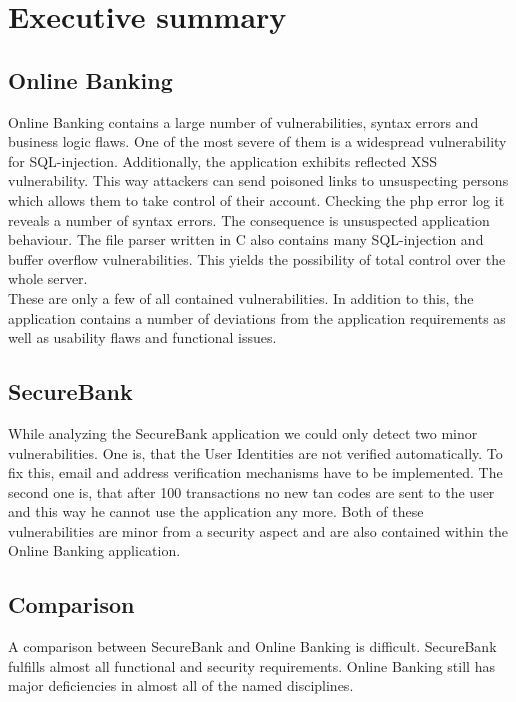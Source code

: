\chapter{Executive summary}
\section*{Online Banking}
Online Banking contains a large number of vulnerabilities, syntax errors and business logic flaws.
One of the most severe of them is a widespread vulnerability for SQL-injection. Additionally, the application exhibits reflected XSS vulnerability. This way attackers can send poisoned links to unsuspecting persons which allows them to take control of their account.
Checking the php error log it reveals a number of syntax errors. The consequence is unsuspected application behaviour.
The file parser written in C also contains many SQL-injection and buffer overflow vulnerabilities. This yields the possibility of total control over the whole server.\\
These are only a few of all contained vulnerabilities.
In addition to this, the application contains a number of deviations from the application requirements as well as usability flaws and functional issues.

\section*{SecureBank}
While analyzing the SecureBank application we could only detect two minor vulnerabilities.
One is, that the User Identities are not verified automatically. To fix this, email and address verification mechanisms have to be implemented.
The second one is, that after 100 transactions no new tan codes are sent to the user and this way he cannot use the application any more.
Both of these vulnerabilities are minor from a security aspect and are also contained within the Online Banking application.

\section*{Comparison}
A comparison between SecureBank and Online Banking is difficult.
SecureBank fulfills almost all functional and security requirements.
Online Banking still has major deficiencies in almost all of the named disciplines.

